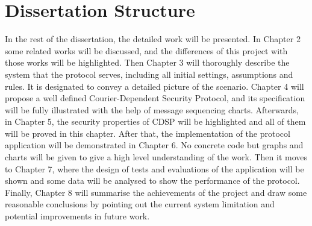 \section{Dissertation Structure}
In the rest of the dissertation, the detailed work will be presented. In Chapter 2 some related works will be discussed, and the differences of this project with those works will be highlighted. Then Chapter 3 will thoroughly describe the system that the protocol serves, including all initial settings, assumptions and rules. It is designated to convey a detailed picture of the scenario. Chapter 4 will propose a well defined Courier-Dependent Security Protocol, and its specification will be fully illustrated with the help of message sequencing charts. Afterwards, in Chapter 5, the security properties of CDSP will be highlighted and all of them will be proved in this chapter. After that, the implementation of the protocol application will be demonstrated in Chapter 6. No concrete code but graphs and charts will be given to give a high level understanding of the work. Then it moves to Chapter 7, where the design of tests and evaluations of the application will be shown and some data will be analysed to show the performance of the protocol. Finally, Chapter 8 will summarise the achievements of the project and draw some reasonable conclusions by pointing out the current system limitation and potential improvements in future work.